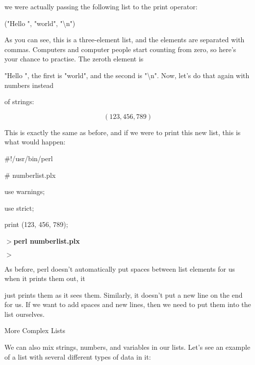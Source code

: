 \documentclass[a4paper,11pt]{book}
\begin{document}
\noindent we were actually passing the following list to the print operator:

\noindent 

\noindent 

\noindent ("Hello ", "world", "\textbackslash n")

\noindent 

\noindent As you can see, this is a three-element list, and the elements are separated with commas. Computers and computer people start counting from zero, so here's your chance to practise. The zeroth element is

\noindent "Hello ", the first is "world", and the second is "\textbackslash n". Now, let's do that again with numbers instead

\noindent of strings:

\noindent 

\noindent 

\[(123, 456, 789)\] 


\noindent This is exactly the same as before, and if we were to print this new list, this is what would happen:

\noindent 

\noindent \#!/usr/bin/perl

\noindent \# numberlist.plx

\noindent use warnings;

\noindent use strict;

\noindent 

\noindent print (123, 456, 789);

\noindent 

\noindent $>$\textbf{perl numberlist.plx}

$>$

\noindent 

\noindent 

\noindent As before, perl doesn't automatically put spaces between list elements for us when it prints them out, it

\noindent just prints them as it sees them. Similarly, it doesn't put a new line on the end for us. If we want to add spaces and new lines, then we need to put them into the list ourselves.

\noindent 

\noindent More Complex Lists

\noindent 

\noindent We can also mix strings, numbers, and variables in our lists. Let's see an example of a list with several different types of data in it:
\end{document}
